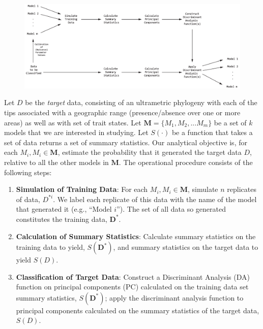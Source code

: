 \documentclass[11pt,openany]{memoir} %
\newcommand{\targetData}{D}
\newcommand{\trainingDataForModel}[1]{D^{*#1}}
\newcommand{\trainingDataSet}{\mathbf{D}^{*}}
\newcommand{\summaryStatisticFunction}{S}
\newcommand{\modelCategory}[1]{M_{#1}}
\newcommand{\modelCategories}{\mathbf{M}}
\begin{document}
\begin{figure}[h!]
    \begin{center}
        \includegraphics[scale=0.5]{figs/flowchart1.pdf}
    \end{center}
\end{figure}

Let $\targetData$ be the \textit{target} data, consisting of an ultrametric phylogeny with each of the tips associated with a geographic range (presence/absence over one or more areas) as well as with set of trait states.
Let $\modelCategories = \{\modelCategory{1}, \modelCategory{2}, ... \modelCategory{m}\}$ be a set of $k$ models that we are interested in studying.
Let $\summaryStatisticFunction(\cdot)$ be a function that takes a set of data returns a set of summary statistics.
Our analytical objective is, for each $\modelCategory{i}, \modelCategory{i} \in \modelCategories$, estimate the probability that it generated the target data $\targetData$, relative to all the other models in $\modelCategories$.
The operational procedure consists of the following steps:
\begin{enumerate}
    \item \textbf{Simulation of Training Data}: For each $\modelCategory{i}, \modelCategory{i} \in \modelCategories$, simulate $n$ replicates of data, $\trainingDataForModel{i}$. We label each replicate of this data with the name of the model that generated it (e.g., ``Model $i$''). The set of all data so generated constitutes the training data, $\trainingDataSet$.
    \item \textbf{Calculation of Summary Statistics}: Calculate summary statistics on the training data to yield, $\summaryStatisticFunction(\trainingDataSet)$, and summary statistics on the target data to yield $\summaryStatisticFunction(\targetData)$.
    \item \textbf{Classification of Target Data}: Construct a Discriminant Analysis (DA) function on principal components (PC) calculated on the training data set summary statistics, $\summaryStatisticFunction(\trainingDataSet)$; apply the discriminant analysis function to principal components calculated on the summary statistics of the target data, $\summaryStatisticFunction(\targetData)$.
\end{enumerate}
\end{document}
